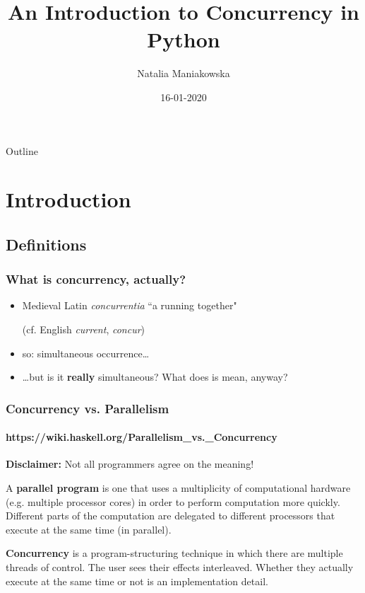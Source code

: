 \documentclass{beamer}
\title{An Introduction to Concurrency in Python}
\author{Natalia Maniakowska}
\institute{skygate}
\date{16-01-2020}
\begin{document}
    \frame{\titlepage}

    \begin{frame}{Outline}
        \tableofcontents
    \end{frame}


    \section{Introduction}

    \subsection{Definitions}


    \begin{frame}
        \frametitle{What is concurrency, actually?}

        \begin{itemize}
            \item Medieval Latin \emph{concurrentia} ``a running together"

            (cf. English \emph{current}, \emph{concur})
            \item so: simultaneous occurrence\dots
            \item \dots but is it \textbf{really} simultaneous? What does is mean, anyway?

        \end{itemize}

    \end{frame}

    \begin{frame}
        \frametitle{Concurrency vs. Parallelism}
        \framesubtitle{https://wiki.haskell.org/Parallelism\_vs.\_Concurrency}

        \textbf{Disclaimer:} Not all programmers agree on the meaning!


        \begin{definition} A \textbf{parallel program} is one that uses a multiplicity of
        computational hardware (e.g. multiple processor cores) in order to perform
        computation more quickly. Different parts of the computation are delegated
        to different processors that execute at the same time (in parallel).

        \end{definition}

        \begin{definition} \textbf{Concurrency} is a program-structuring technique
        in which there are multiple threads of control. The user sees their effects interleaved.
        Whether they actually execute at the same time or not is an implementation detail.

        \end{definition}

    \end{frame}
\end{document}
